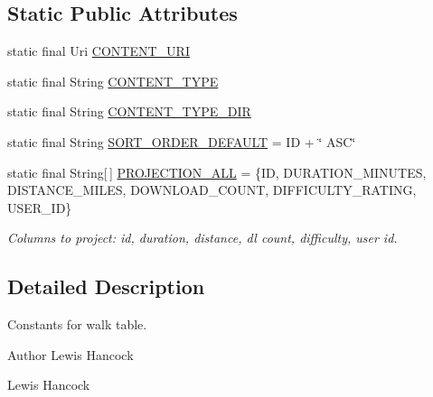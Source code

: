 \subsection*{Static Public Attributes}
\begin{DoxyCompactItemize}
\item 
static final Uri \hyperlink{classuk_1_1ac_1_1swan_1_1digitaltrails_1_1database_1_1_white_rock_contract_1_1_walk_a636ef2628c2909ed76334474a941afb2}{C\+O\+N\+T\+E\+N\+T\+\_\+\+U\+R\+I}
\item 
static final String \hyperlink{classuk_1_1ac_1_1swan_1_1digitaltrails_1_1database_1_1_white_rock_contract_1_1_walk_a7193f4a3c07e73c898f0074306f63439}{C\+O\+N\+T\+E\+N\+T\+\_\+\+T\+Y\+P\+E}
\item 
static final String \hyperlink{classuk_1_1ac_1_1swan_1_1digitaltrails_1_1database_1_1_white_rock_contract_1_1_walk_a85e53becaea8cd11e73df3937bed9243}{C\+O\+N\+T\+E\+N\+T\+\_\+\+T\+Y\+P\+E\+\_\+\+D\+I\+R}
\item 
static final String \hyperlink{classuk_1_1ac_1_1swan_1_1digitaltrails_1_1database_1_1_white_rock_contract_1_1_walk_a42866fe0b72909800a9b607ae4e48880}{S\+O\+R\+T\+\_\+\+O\+R\+D\+E\+R\+\_\+\+D\+E\+F\+A\+U\+L\+T} = I\+D + \char`\"{} A\+S\+C\char`\"{}
\item 
static final String\mbox{[}$\,$\mbox{]} \hyperlink{classuk_1_1ac_1_1swan_1_1digitaltrails_1_1database_1_1_white_rock_contract_1_1_walk_af2c95a7369fa3bc3a3fa7081bdaaac3b}{P\+R\+O\+J\+E\+C\+T\+I\+O\+N\+\_\+\+A\+L\+L} = \{I\+D, D\+U\+R\+A\+T\+I\+O\+N\+\_\+\+M\+I\+N\+U\+T\+E\+S, D\+I\+S\+T\+A\+N\+C\+E\+\_\+\+M\+I\+L\+E\+S, D\+O\+W\+N\+L\+O\+A\+D\+\_\+\+C\+O\+U\+N\+T, D\+I\+F\+F\+I\+C\+U\+L\+T\+Y\+\_\+\+R\+A\+T\+I\+N\+G, U\+S\+E\+R\+\_\+\+I\+D\}
\begin{DoxyCompactList}\small\item\em Columns to project\+: id, duration, distance, dl count, difficulty, user id. \end{DoxyCompactList}\end{DoxyCompactItemize}


\subsection{Detailed Description}
Constants for walk table. 

\begin{DoxyAuthor}{Author}
Lewis Hancock 

Lewis Hancock 
\end{DoxyAuthor}


